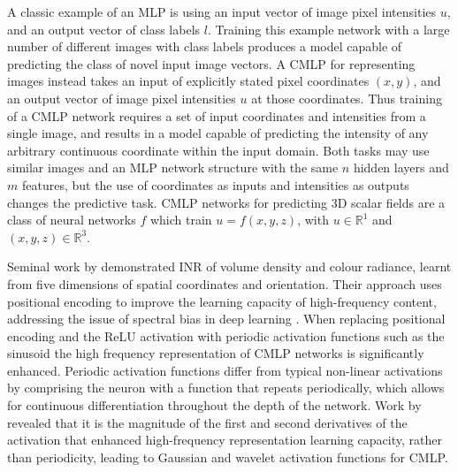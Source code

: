 A classic example of an MLP is using an input vector of image pixel intensities \(u\), and an output vector of class labels \(l\).
Training this example network with a large number of different images with class labels produces a model capable of predicting the class of novel input image vectors.
A CMLP for representing images instead takes an input of explicitly stated pixel coordinates \((x,y)\), and an output vector of image pixel intensities \(u\) at those coordinates.
Thus training of a CMLP network requires a set of input coordinates and intensities from a single image, and results in a model capable of predicting the intensity of any arbitrary continuous coordinate within the input domain.
Both tasks may use similar images and an MLP network structure with the same \(n\) hidden layers and \(m\) features, but the use of coordinates as inputs and intensities as outputs changes the predictive task.
CMLP networks for predicting 3D scalar fields are a class of neural networks \(f\) which train \(u = f(x,y,z)\), with \(u\in\mathbb{R}^1\) and \((x,y,z)\in\mathbb{R}^3\).

Seminal work by \textcite{mildenhallNeRFRepresentingScenes2020} demonstrated INR of volume density and colour radiance, learnt from five dimensions of spatial coordinates and orientation.
Their approach uses positional encoding to improve the learning capacity of high-frequency content, addressing the issue of spectral bias in deep learning \parencite{rahamanSpectralBiasNeural2019}.
When replacing positional encoding and the ReLU activation with periodic activation functions such as the sinusoid \parencite{sitzmann2019siren} the high frequency representation of CMLP networks is significantly enhanced.
Periodic activation functions differ from typical non-linear activations by comprising the neuron with a function that repeats periodically, which allows for continuous differentiation throughout the depth of the network.
Work by \textcite{ramasinghePeriodicityUnifyingFramework2022} revealed that it is the magnitude of the first and second derivatives of the activation that enhanced high-frequency representation learning capacity, rather than periodicity, leading to Gaussian \parencite{ramasinghePeriodicityUnifyingFramework2022} and wavelet \parencite{saragadamWIREWaveletImplicit2023} activation functions for CMLP\@.

